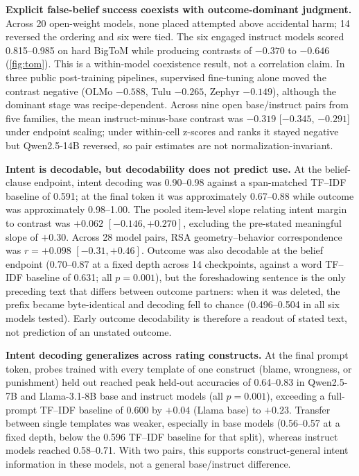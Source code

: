 \documentclass{article}
\begin{document}
\textbf{Explicit false-belief success coexists with outcome-dominant judgment.}
Across 20 open-weight models, none placed attempted above accidental harm; 14 reversed the ordering and six were tied.
The six engaged instruct models scored 0.815--0.985 on hard BigToM while producing contrasts of $-0.370$ to $-0.646$ (\cref{fig:tom}).
This is a within-model coexistence result, not a correlation claim.
In three public post-training pipelines, supervised fine-tuning alone moved the contrast negative (OLMo $-0.588$, Tulu $-0.265$, Zephyr $-0.149$), although the dominant stage was recipe-dependent.
Across nine open base/instruct pairs from five families, the mean instruct-minus-base contrast was $-0.319$ [$-0.345$, $-0.291$] under endpoint scaling; under within-cell z-scores and ranks it stayed negative but Qwen2.5-14B reversed, so pair estimates are not normalization-invariant.

\textbf{Intent is decodable, but decodability does not predict use.}
At the belief-clause endpoint, intent decoding was 0.90--0.98 against a span-matched TF--IDF baseline of 0.591; at the final token it was approximately 0.67--0.88 while outcome was approximately 0.98--1.00.
The pooled item-level slope relating intent margin to contrast was $+0.062$ $[-0.146,+0.270]$, excluding the pre-stated meaningful slope of $+0.30$.
Across 28 model pairs, RSA geometry--behavior correspondence was $r=+0.098$ $[-0.31,+0.46]$.
Outcome was also decodable at the belief endpoint (0.70--0.87 at a fixed depth across 14 checkpoints, against a word TF--IDF baseline of 0.631; all $p=0.001$), but the foreshadowing sentence is the only preceding text that differs between outcome partners: when it was deleted, the prefix became byte-identical and decoding fell to chance (0.496--0.504 in all six models tested).
Early outcome decodability is therefore a readout of stated text, not prediction of an unstated outcome.

\textbf{Intent decoding generalizes across rating constructs.}
At the final prompt token, probes trained with every template of one construct (blame, wrongness, or punishment) held out reached peak held-out accuracies of 0.64--0.83 in Qwen2.5-7B and Llama-3.1-8B base and instruct models (all $p=0.001$), exceeding a full-prompt TF--IDF baseline of 0.600 by $+0.04$ (Llama base) to $+0.23$.
Transfer between single templates was weaker, especially in base models (0.56--0.57 at a fixed depth, below the 0.596 TF--IDF baseline for that split), whereas instruct models reached 0.58--0.71.
With two pairs, this supports construct-general intent information in these models, not a general base/instruct difference.
\end{document}
